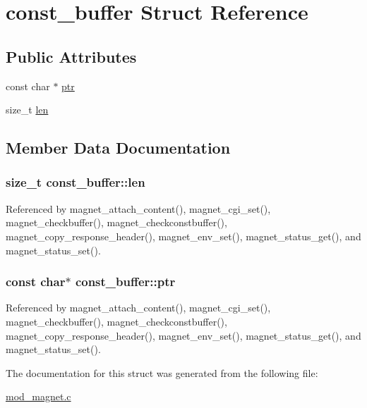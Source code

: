 \hypertarget{structconst__buffer}{\section{const\-\_\-buffer Struct Reference}
\label{structconst__buffer}
}
\subsection*{Public Attributes}
\begin{DoxyCompactItemize}
\item 
const char $\ast$ \hyperlink{structconst__buffer_a45dcc76fe3fbf5aed32b8c82892568ad}{ptr}
\item 
size\-\_\-t \hyperlink{structconst__buffer_aeea2fa428f380d27375680cc0d7d9952}{len}
\end{DoxyCompactItemize}


\subsection{Member Data Documentation}
\hypertarget{structconst__buffer_aeea2fa428f380d27375680cc0d7d9952}{
\subsubsection[{len}]{\setlength{\rightskip}{0pt plus 5cm}size\-\_\-t const\-\_\-buffer\-::len}}\label{structconst__buffer_aeea2fa428f380d27375680cc0d7d9952}


Referenced by magnet\-\_\-attach\-\_\-content(), magnet\-\_\-cgi\-\_\-set(), magnet\-\_\-checkbuffer(), magnet\-\_\-checkconstbuffer(), magnet\-\_\-copy\-\_\-response\-\_\-header(), magnet\-\_\-env\-\_\-set(), magnet\-\_\-status\-\_\-get(), and magnet\-\_\-status\-\_\-set().

\hypertarget{structconst__buffer_a45dcc76fe3fbf5aed32b8c82892568ad}{
\subsubsection[{ptr}]{\setlength{\rightskip}{0pt plus 5cm}const char$\ast$ const\-\_\-buffer\-::ptr}}\label{structconst__buffer_a45dcc76fe3fbf5aed32b8c82892568ad}


Referenced by magnet\-\_\-attach\-\_\-content(), magnet\-\_\-cgi\-\_\-set(), magnet\-\_\-checkbuffer(), magnet\-\_\-checkconstbuffer(), magnet\-\_\-copy\-\_\-response\-\_\-header(), magnet\-\_\-env\-\_\-set(), magnet\-\_\-status\-\_\-get(), and magnet\-\_\-status\-\_\-set().



The documentation for this struct was generated from the following file\-:\begin{DoxyCompactItemize}
\item 
\hyperlink{mod__magnet_8c}{mod\-\_\-magnet.\-c}\end{DoxyCompactItemize}
